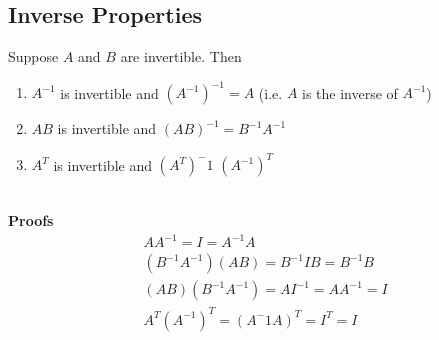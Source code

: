\subsection{Inverse Properties}
Suppose $A$ and $B$ are invertible. Then 
\begin{enumerate}
  \item $A^{-1}$ is invertible and $(A^{-1})^{-1} = A$ (i.e. $A$ is the 
    inverse of $A^{-1}$)
  \item $AB$ is invertible and $(AB)^{-1} = B^{-1}A^{-1}$ 
  \item $A^{T}$ is invertible and $(A^T)^-1$ $(A^{-1})^T$
\end{enumerate}
\\[8pt]
\textbf{Proofs}
\[
  \begin{aligned}
    &AA^{-1} = I = A^{-1}A \\[8pt]
    &(B^{-1}A^{-1})(AB) = B^{-1}IB = B^{-1}B \\
    &(AB)(B^{-1}A^{-1}) = AI^{-1} = AA^{-1} = I \\[8pt] 
    &A^T(A^{-1})^T = (A^-1A)^T = I^T = I
  \end{aligned}
\]

